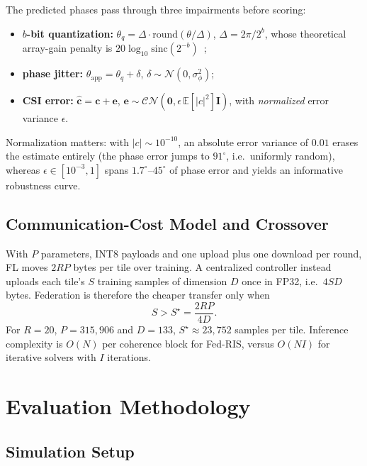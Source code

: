 \documentclass[conference]{IEEEtran}
\newcommand{\fedris}{Fed-RIS}
\begin{document}
The predicted phases pass through three impairments before scoring:
\begin{itemize}
\item \textbf{$b$-bit quantization:} $\theta_q=\Delta\cdot\mathrm{round}(\theta/\Delta)$, $\Delta=2\pi/2^b$, whose theoretical array-gain penalty is $20\log_{10}\mathrm{sinc}(2^{-b})$~\cite{wu2020discrete};
\item \textbf{phase jitter:} $\theta_\text{app}=\theta_q+\delta$, $\delta\sim\mathcal{N}(0,\sigma_\phi^2)$;
\item \textbf{CSI error:} $\hat{\bm{c}}=\bm{c}+\bm{e}$, $\bm{e}\sim\mathcal{CN}(\bm{0},\epsilon\,\mathbb{E}[|c|^2]\bm{I})$, with \emph{normalized} error variance $\epsilon$.
\end{itemize}
Normalization matters: with $|c|\sim10^{-10}$, an absolute error variance of $0.01$ erases the estimate entirely (the phase error jumps to $91^\circ$, i.e.\ uniformly random), whereas $\epsilon\in[10^{-3},1]$ spans $1.7^\circ$--$45^\circ$ of phase error and yields an informative robustness curve.

\subsection{Communication-Cost Model and Crossover}

With $P$ parameters, INT8 payloads and one upload plus one download per round, FL moves $2RP$ bytes per tile over training. A centralized controller instead uploads each tile's $S$ training samples of dimension $D$ once in FP32, i.e.\ $4SD$ bytes. Federation is therefore the cheaper transfer only when
\begin{equation}
S > S^\star = \frac{2RP}{4D}.
\label{eq:crossover}
\end{equation}
For $R=20$, $P=315{,}906$ and $D=133$, $S^\star\approx23{,}752$ samples per tile. Inference complexity is $O(N)$ per coherence block for \fedris{}, versus $O(NI)$ for iterative solvers with $I$ iterations.

\section{Evaluation Methodology}
\label{sec:setup}

\subsection{Simulation Setup}
\end{document}
